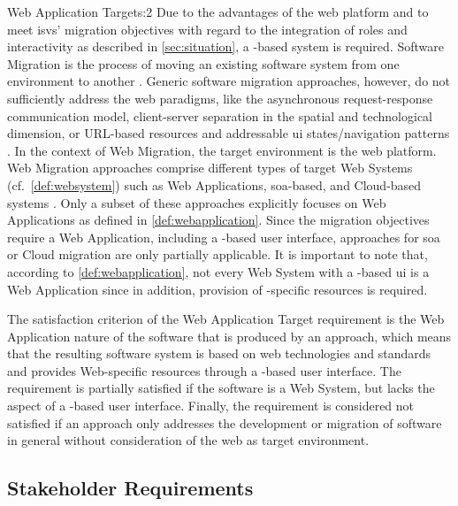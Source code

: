 \begin{thesisscoperequirement}{Web Application Target}{s:2}
Due to the advantages of the \gls{web} platform \autocite{Gitzel2007WebEngineeringMDD,Knorr2003WebAsPlatform} and to meet \glspl{isv}' migration objectives with regard to the integration of roles and interactivity as described in \cref{sec:situation}, a -based system is required.
\gls{Software Migration} is the process of moving an existing software system from one environment to another \autocite{SWEBOK2014}.
Generic software migration approaches, however, do not sufficiently address the \gls{web} paradigms, like the asynchronous request-response communication model, client-server separation in the spatial and technological dimension, or URL-based resources and addressable \gls{ui} states/navigation patterns \autocite{Heil2017Survey}.
In the context of \gls{Web Migration}, the \gls{target environment} is the \gls{web} platform.
\gls{Web Migration} approaches comprise different types of target \glspl{Web System} (cf.~\cref{def:websystem}) such as \glspl{Web Application}, \gls{soa}-based, and Cloud-based systems \autocite{Heil2017Survey}.
Only a subset of these approaches explicitly focuses on \glspl{Web Application} as defined in \cref{def:webapplication}.
Since the migration objectives require a \gls{Web Application}, including a -based user interface, approaches for \gls{soa} or Cloud migration are only partially applicable.
It is important to note that, according to \cref{def:webapplication}, not every \gls{Web System} with a -based \gls{ui} is a \gls{Web Application} since in addition, provision of -specific resources is required.

The satisfaction criterion of the Web Application Target requirement is the \gls{Web Application} nature of the software that is produced by an approach, which means that the resulting software system is based on \gls{web} technologies and standards and provides Web-specific resources through a -based user interface.
The requirement is partially satisfied if the software is a \gls{Web System}, but lacks the aspect of a -based user interface.
Finally, the requirement is considered not satisfied if an approach only addresses the development or migration of software in general without consideration of the \gls{web} as target environment.
\end{thesisscoperequirement}

\pagebreak
\hypertarget{stakeholder-requirements}{%
\subsection{Stakeholder Requirements}\label{stakeholder-requirements}}
\vspace{10pt}

